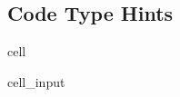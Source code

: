 \documentclass[letterpaper,10pt,english]{jupyterBook}
\begin{document}
\subsection{Code Type Hints}
\label{\detokenize{Model_evaluation:code-type-hints}}
\begin{sphinxuseclass}{cell}\begin{sphinxVerbatimInput}

\begin{sphinxuseclass}{cell_input}
\begin{sphinxVerbatim}[commandchars=\\\{\}]
   
\end{sphinxVerbatim}

\end{sphinxuseclass}\end{sphinxVerbatimInput}

\end{sphinxuseclass}
\end{document}
